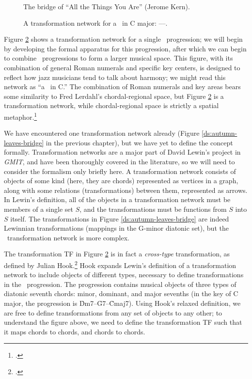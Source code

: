 \begin{figure}[tbp]
  \caption{The bridge of “All the Things You Are” (Jerome Kern).}
  \label{tf:all-things-bridge}
\end{figure}

\begin{figure}[tbp]
  \caption[A transformation network for a single \tfo\ progression.]{A
  transformation network for a \tfo\ in C major: ----.}
  \label{tf:single-tfo-network}
\end{figure}

Figure \ref{tf:single-tfo-network} shows a transformation network for a single
\tfo\ progression; we will begin by developing the formal apparatus for this
progression, after which we can begin to combine \tfo\ progressions to form a
larger musical space. This figure, with its combination of
general Roman numerals and specific key centers, is designed to reflect how
jazz musicians tend to talk about harmony; we might read this network as “a
\tfo\ in C.” The combination of Roman numerals and key areas bears some
similarity to Fred Lerdahl’s chordal-regional space, but Figure
\ref{tf:single-tfo-network} is a transformation network, while
chordal-regional space is strictly a spatial
metaphor.\footcite[96--97]{lerdahl:2004}

We have encountered one transformation network already (Figure
\ref{ds:autumn-leaves-bridge} in the previous chapter), but we have yet to
define the concept formally. Transformation networks are a major part of David
Lewin’s project in \emph{GMIT}, and have been thoroughly covered in the
literature, so we will need to consider the formalism only briefly
here. A transformation network consists of objects of some kind
(here, they are chords) represented as vertices in a graph, along with some
relations (transformations) between them, represented as arrows. In Lewin's
definition, all of the objects in a transformation network must be members of
a single set $S$, and the transformations must be functions from $S$ into $S$
itself. The transformations in Figure \ref{ds:autumn-leaves-bridge}
are indeed Lewinnian transformations (mappings in the G-minor diatonic set),
but the \tfo\ transformation network is more complex.

The transformation TF in Figure \ref{tf:single-tfo-network} is in fact a
\emph{cross-type} transformation, as defined by Julian
Hook.\footcite{hook:2007} Hook expands Lewin’s definition of a transformation
network to include objects of different types, necessary to define
transformations in the \tfo\ progression. The progression contains musical
objects of three types of diatonic seventh chords: minor, dominant,
and major sevenths (in the key of C major, the progression is
\h{Dm7}--\h{G7}--\h{Cmaj7}). Using Hook's relaxed definition, we are free to
define transformations from any set of objects to any other; to understand the
figure above, we need to define the transformation TF such that it maps
\ii chords to \V chords, and \V chords to \I
chords.

